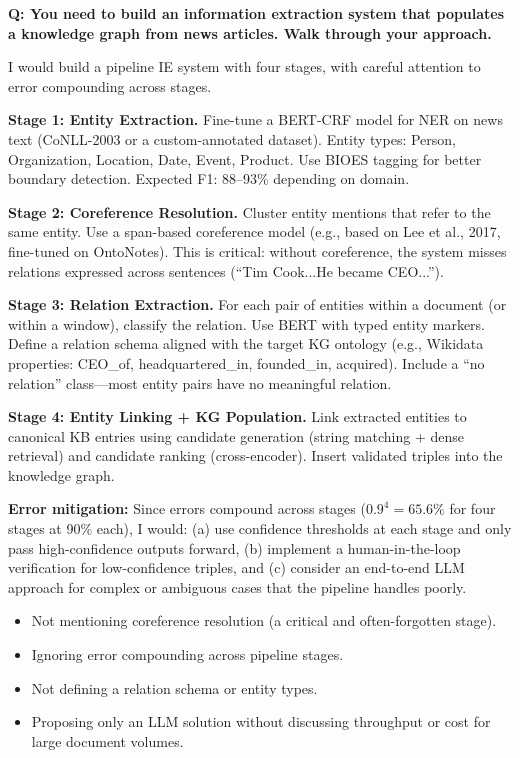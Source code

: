 \vspace{0.5em}

\begin{interviewq}
\textbf{Q: You need to build an information extraction system that populates a knowledge graph
from news articles. Walk through your approach.}

 \quad {} \quad \badgefreq{\freqmed}

\stronganswer
I would build a pipeline IE system with four stages, with careful attention to error
compounding across stages.

\textbf{Stage 1: Entity Extraction.}
Fine-tune a BERT-CRF model for NER on news text (CoNLL-2003 or a custom-annotated dataset).
Entity types: Person, Organization, Location, Date, Event, Product.  Use BIOES tagging for
better boundary detection.  Expected F1: 88--93\% depending on domain.

\textbf{Stage 2: Coreference Resolution.}
Cluster entity mentions that refer to the same entity.  Use a span-based coreference model
(e.g., based on Lee et al., 2017, fine-tuned on OntoNotes).  This is critical: without
coreference, the system misses relations expressed across sentences (``Tim Cook...He became
CEO...'').

\textbf{Stage 3: Relation Extraction.}
For each pair of entities within a document (or within a window), classify the relation.
Use BERT with typed entity markers.  Define a relation schema aligned with the target KG
ontology (e.g., Wikidata properties: CEO\_of, headquartered\_in, founded\_in, acquired).
Include a ``no relation'' class---most entity pairs have no meaningful relation.

\textbf{Stage 4: Entity Linking + KG Population.}
Link extracted entities to canonical KB entries using candidate generation (string matching
+ dense retrieval) and candidate ranking (cross-encoder).  Insert validated triples into
the knowledge graph.

\textbf{Error mitigation:}  Since errors compound across stages ($0.9^4 = 65.6\%$ for four
stages at 90\% each), I would: (a) use confidence thresholds at each stage and only pass
high-confidence outputs forward, (b) implement a human-in-the-loop verification for
low-confidence triples, and (c) consider an end-to-end LLM approach for complex or ambiguous
cases that the pipeline handles poorly.

\redflags
\begin{itemize}
    \item Not mentioning coreference resolution (a critical and often-forgotten stage).
    \item Ignoring error compounding across pipeline stages.
    \item Not defining a relation schema or entity types.
    \item Proposing only an LLM solution without discussing throughput or cost for large
    document volumes.
\end{itemize}


\end{interviewq}
